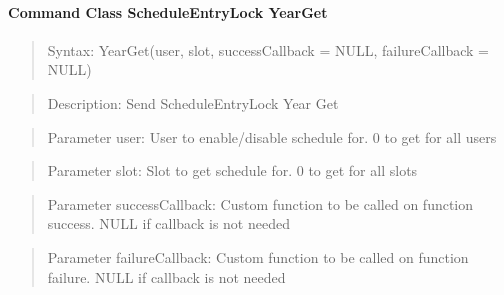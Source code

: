\paragraph {Command Class ScheduleEntryLock YearGet}
\begin{quote} Syntax: YearGet(user, slot, successCallback = NULL, failureCallback = NULL)\end{quote}
\begin{quote} Description: Send ScheduleEntryLock Year Get\end{quote}
\begin{quote} Parameter user: User to enable/disable schedule for. 0 to get for all users\end{quote}
\begin{quote} Parameter slot: Slot to get schedule for. 0 to get for all slots\end{quote}
\begin{quote} Parameter successCallback: Custom function to be called on function success. NULL if callback is not needed\end{quote}
\begin{quote} Parameter failureCallback: Custom function to be called on function failure. NULL if callback is not needed\end{quote}

